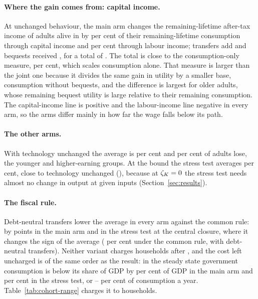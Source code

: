 \paragraph{Where the gain comes from: capital income.} At unchanged behaviour, the main arm changes the remaining-lifetime after-tax income of adults alive in \genShockYear{} by \genCohMainDnCentralSrcCap{} per cent of their remaining-lifetime consumption through capital income and \genCohMainDnCentralSrcLab{} per cent through labour income; transfers add \genCohMainDnCentralSrcTr{} and bequests received \genCohMainDnCentralSrcBeq{}, for a total of \genCohMainDnCentralSrcTot{}. The total is close to the consumption-only measure, \genCohMainDnCentralConsOnly{} per cent, which scales consumption alone. That measure is larger than the joint one because it divides the same gain in utility by a smaller base, consumption without bequests, and the difference is largest for older adults, whose remaining bequest utility is large relative to their remaining consumption. The capital-income line is positive and the labour-income line negative in every arm, so the arms differ mainly in how far the wage falls below its path.

\paragraph{The other arms.} With technology unchanged the average is \genCohFlatDnCentralAvg{} per cent and \genCohFlatDnCentralLosingPct{} per cent of adults lose, the younger and higher-earning groups. At the bound the stress test averages \genCohStressDnBoundAvg{} per cent, close to technology unchanged (\genCohFlatDnBoundAvg{}), because at $\zeta_K = 0{}$ the stress test needs almost no change in output at given inputs (Section~\ref{sec:results}).

\paragraph{The fiscal rule.} Debt-neutral transfers lower the average in every arm against the common rule: by \genCohMainDnLessCommonCentralAbs{} points in the main arm and \genCohStressDnLessCommonCentralAbs{} in the stress test at the central closure, where it changes the sign of the average (\genCohStressCommonCentralAvg{} per cent under the common rule, \genCohStressDnCentralAvg{} with debt-neutral transfers). Neither variant charges households after \genLastFlowYear{}, and the cost left uncharged is of the same order as the result: in the steady state government consumption is below its share of GDP by \genCohMainDnCentralGShortSsPctGdp{} per cent of GDP in the main arm and \genCohStressDnCentralGShortSsPctGdp{} per cent in the stress test, or \genCohMainDnCentralGShortSsPctC--\genCohStressDnCentralGShortSsPctC{} per cent of consumption a year. Table~\ref{tab:cohort-range} charges it to households.

